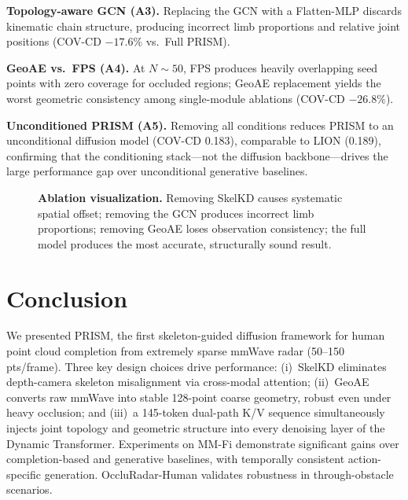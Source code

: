 \documentclass{article}
\begin{document}
\textbf{Topology-aware GCN (A3).}
Replacing the GCN with a Flatten-MLP discards kinematic chain structure,
producing incorrect limb proportions and relative joint positions
(COV-CD $-17.6\%$ vs.\ Full PRISM).

\textbf{GeoAE vs.\ FPS (A4).}
At $N\!\sim\!50$, FPS produces heavily overlapping seed points with zero coverage
for occluded regions; GeoAE replacement yields the worst geometric consistency
among single-module ablations (COV-CD $-26.8\%$).

\textbf{Unconditioned PRISM (A5).}
Removing all conditions reduces PRISM to an unconditional diffusion model
(COV-CD 0.183), comparable to LION (0.189), confirming that the conditioning
stack---not the diffusion backbone---drives the large performance gap
over unconditional generative baselines.

\begin{figure}[t]
  \centering
  \caption{
    \textbf{Ablation visualization.}
    Removing SkelKD causes systematic spatial offset;
    removing the GCN produces incorrect limb proportions;
    removing GeoAE loses observation consistency;
    the full model produces the most accurate, structurally sound result.
  }
  \label{fig:ablation}
\end{figure}

\section{Conclusion}
\label{sec:conclusion}

We presented PRISM, the first skeleton-guided diffusion framework for
human point cloud completion from extremely sparse mmWave radar (50--150 pts/frame).
Three key design choices drive performance:
(i)~SkelKD eliminates depth-camera skeleton misalignment via cross-modal attention;
(ii)~GeoAE converts raw mmWave into stable 128-point coarse geometry,
robust even under heavy occlusion; and
(iii)~a 145-token dual-path K/V sequence simultaneously injects joint topology
and geometric structure into every denoising layer of the Dynamic Transformer.
Experiments on MM-Fi demonstrate significant gains over completion-based and
generative baselines, with temporally consistent action-specific generation.
OccluRadar-Human validates robustness in through-obstacle scenarios.
\end{document}
